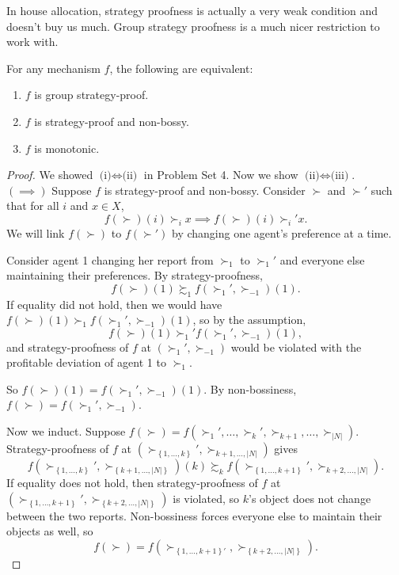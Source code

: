 In house allocation, strategy proofness is actually a very weak condition and doesn't buy us much. Group strategy proofness is a much nicer restriction to work with.
\begin{lemma} \label{5-13-1}
	For any mechanism $f$, the following are equivalent:
	\begin{enumerate}[label = (\roman*)]
		\item $f$ is group strategy-proof.
		\item $f$ is strategy-proof and non-bossy.
		\item $f$ is monotonic.
	\end{enumerate}
\end{lemma}
\begin{proof}
	We showed $\text{(i)} \iff \text{(ii)}$ in Problem Set 4.
	Now we show $\text{(ii)}\iff\text{(iii)}$.\\
	$(\implies)$ Suppose $f$ is strategy-proof and non-bossy.
	Consider $\succ$ and $\succ'$ such that for all $i$ and $x \in X$, \[
		f(\succ)(i) \succ_i x \implies f(\succ)(i) \succ_i' x
	.\] 
	We will link $f(\succ)$ to $f(\succ')$ by changing one agent's preference at a time.

	Consider agent 1 changing her report from $\succ_1$ to $\succ_1'$ and everyone else maintaining their preferences.
	By strategy-proofness, \[
		f(\succ)(1) \succsim_1 f(\succ_1',\succ_{-1})(1)
	.\] 
	If equality did not hold, then we would have $f(\succ)(1) \succ_1 f(\succ_1',\succ_{-1})(1)$, so by the assumption, \[
		f(\succ)(1) \succ_1' f(\succ_1',\succ_{-1})(1)
	,\] and strategy-proofness of $f$ at $(\succ_1', \succ_{-1})$ would be violated with the profitable deviation of agent 1 to $\succ_1$.

	So $f(\succ)(1) = f(\succ_1',\succ_{-1})(1)$. By non-bossiness, $f(\succ) = f(\succ_1',\succ_{-1})$.

	Now we induct. Suppose $f(\succ) = f(\succ_1',\ldots,\succ_{k}', \succ_{k+1},\ldots,\succ_{\left| N \right|})$.
	Strategy-proofness of $f$ at $(\succ_{\left\{1,\ldots,k\right\}}',\succ_{k+1,\ldots,\left| N \right|})$ gives \[
		f(\succ_{\left\{1,\ldots,k\right\}}',\succ_{\left\{k+1,\ldots,\left| N \right|\right\}})(k) \succsim_{k} f\left( \succ_{\left\{1,\ldots,k+1\right\}}',\succ_{k+2,\ldots,\left| N \right|} \right)
	.\] If equality does not hold, then strategy-proofness of $f$ at $(\succ_{\left\{1,\ldots,k+1\right\}}',\succ_{\left\{k+2,\ldots,\left| N \right|\right\}})$ is violated, so $k$'s object does not change between the two reports.
	Non-bossiness forces everyone else to maintain their objects as well, so \[
		f(\succ) = f\left( \succ_{\left\{1,\ldots,k+1\right\}'},\succ_{\left\{k+2,\ldots,\left| N \right|\right\}} \right)
	.\] 


\end{proof}
